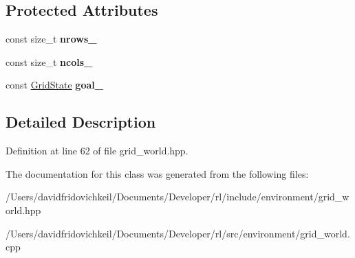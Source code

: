 \subsection*{Protected Attributes}
\begin{DoxyCompactItemize}
\item 
\hypertarget{classrl_1_1_grid_world_a1f4ab8ba45c7147e73f31f1defa26805}{}\label{classrl_1_1_grid_world_a1f4ab8ba45c7147e73f31f1defa26805} 
const size\+\_\+t {\bfseries nrows\+\_\+}
\item 
\hypertarget{classrl_1_1_grid_world_a42a1de550277a88ed5f2ed5ca2440c22}{}\label{classrl_1_1_grid_world_a42a1de550277a88ed5f2ed5ca2440c22} 
const size\+\_\+t {\bfseries ncols\+\_\+}
\item 
\hypertarget{classrl_1_1_grid_world_a0ddd4ee28669bb9c3033001bb23e4380}{}\label{classrl_1_1_grid_world_a0ddd4ee28669bb9c3033001bb23e4380} 
const \hyperlink{structrl_1_1_grid_state}{Grid\+State} {\bfseries goal\+\_\+}
\end{DoxyCompactItemize}


\subsection{Detailed Description}


Definition at line 62 of file grid\+\_\+world.\+hpp.



The documentation for this class was generated from the following files\+:\begin{DoxyCompactItemize}
\item 
/\+Users/davidfridovichkeil/\+Documents/\+Developer/rl/include/environment/grid\+\_\+world.\+hpp\item 
/\+Users/davidfridovichkeil/\+Documents/\+Developer/rl/src/environment/grid\+\_\+world.\+cpp\end{DoxyCompactItemize}

